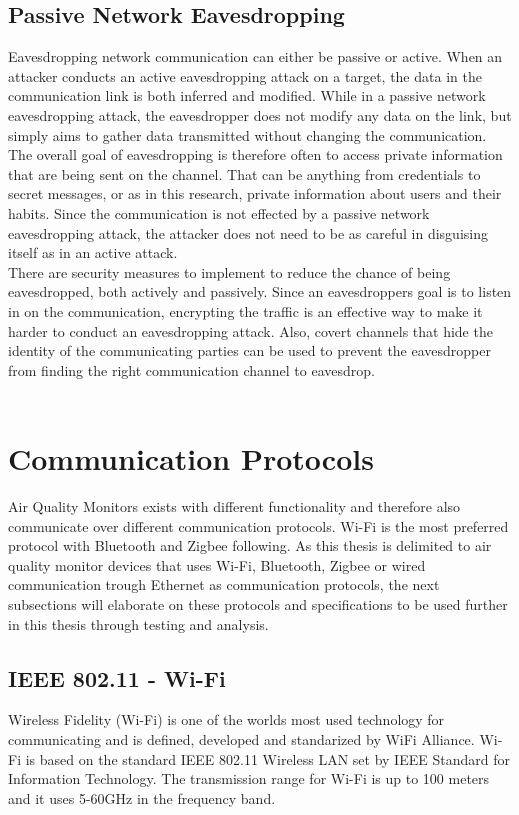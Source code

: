 \subsection*{Passive Network Eavesdropping}
Eavesdropping network communication can either be passive or active. When an attacker conducts an active eavesdropping attack on a target, the data in the communication link is both inferred and modified. \cite{Eavesdropping} While in a passive network eavesdropping attack, the eavesdropper does not modify any data on the link, but simply aims to gather data transmitted without changing the communication. The overall goal of eavesdropping is therefore often to access private information that are being sent on the channel. That can be anything from credentials to secret messages, or as in this research, private information about users and their habits. \cite{Eavesdropping} Since the communication is not effected by a passive network eavesdropping attack, the attacker does not need to be as careful in disguising itself as in an active attack.  
\\
There are security measures to implement to reduce the chance of being eavesdropped, both actively and passively. Since an eavesdroppers goal is to listen in on the communication, encrypting the traffic is an effective way to make it harder to conduct an eavesdropping attack. Also, covert channels that hide the identity of the communicating parties can be used to prevent the eavesdropper from finding the right communication channel to eavesdrop. \cite{Eavesdropping}
\\\\
\section*{Communication Protocols}
Air Quality Monitors exists with different functionality and therefore also communicate over different communication protocols. Wi-Fi is the most preferred protocol with Bluetooth and Zigbee following. \cite{saini2020indoor} As this thesis is delimited to air quality monitor devices that uses Wi-Fi, Bluetooth, Zigbee or wired communication trough Ethernet as communication protocols, the next subsections will elaborate on these protocols and specifications to be used further in this thesis through testing and analysis. 

\subsection*{IEEE 802.11 - Wi-Fi}
Wireless Fidelity (Wi-Fi) \cite{WiFiAlliance} is one of the worlds most used technology for communicating and is defined, developed and standarized by WiFi Alliance. \cite{WiFiAlliance} Wi-Fi is based on the standard IEEE 802.11 Wireless LAN set by IEEE Standard for Information Technology. \cite{WifiStandard} The transmission range for Wi-Fi is up to 100 meters and it uses 5-60GHz in the frequency band. \cite{IAQMonitorCommunicationReview}

